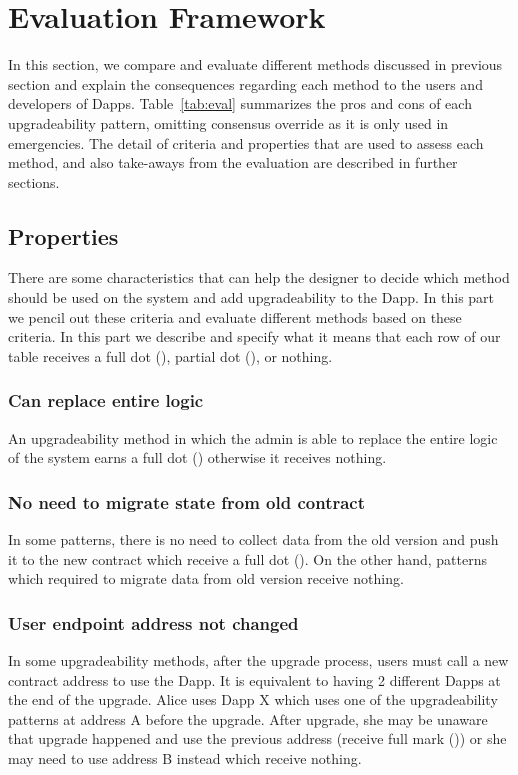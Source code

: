 \section{Evaluation Framework}
\label{app:eval}



In this section, we compare and evaluate different methods discussed in previous section and explain the consequences regarding each method to the users and developers of Dapps.
Table~\ref{tab:eval} summarizes the pros and cons of each upgradeability pattern, omitting consensus override as it is only used in emergencies. The detail of criteria and properties that are used to assess each method, and also take-aways from the evaluation are described in further sections.

\subsection{Properties}

There are some characteristics that can help the designer to decide which method should be used on the system and add upgradeability to the Dapp. In this part we pencil out these criteria and evaluate different methods based on these criteria. In this part we describe and specify what it means that each row of our table receives a full dot (\full), partial dot (\prt), or nothing. 

\subsubsection{Can replace entire logic}
An upgradeability method in which the admin is able to replace the entire logic of the system earns a full dot (\full) otherwise it receives nothing.

\subsubsection{No need to migrate state from old contract}
In some patterns, there is no need to collect data from the old version and push it to the new contract which receive a full dot (\full). On the other hand, patterns which required to migrate data from old version receive nothing.

\subsubsection{User endpoint address not changed}
In some upgradeability methods, after the upgrade process, users must call a new contract address to use the Dapp. It is equivalent to having 2 different Dapps at the end of the upgrade. Alice uses Dapp X which uses one of the upgradeability patterns at address A before the upgrade. After upgrade, she may be unaware that upgrade happened and use the previous address (receive full mark (\full)) or she may need to use address B instead which receive nothing.

